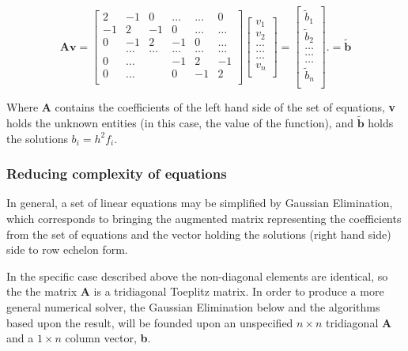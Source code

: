\documentclass[%
oneside,                 %
final,                   %
10pt]{article}
\begin{document}
\[
    \mathbf{A} \mathbf{v}= \begin{bmatrix}
                           2& -1& 0 &\dots   & \dots &0 \\
                           -1 & 2 & -1 &0 &\dots &\dots \\
                           0&-1 &2 & -1 & 0 & \dots \\
                           & \dots   & \dots &\dots   &\dots & \dots \\
                           0&\dots   &  &-1 &2& -1 \\
                           0&\dots    &  & 0  &-1 & 2 \\
              			\end{bmatrix}\begin{bmatrix}
                           v_1\\
                           v_2\\
                           \dots \\
                          \dots  \\
                          \dots \\
                           v_n\\
                      \end{bmatrix}
  =\begin{bmatrix}
                           \tilde{b}_1\\
                           \tilde{b}_2\\
                           \dots \\
                           \dots \\
                          \dots \\
                           \tilde{b}_n\\
                      \end{bmatrix}.=\mathbf{\tilde{b}}
\]

Where \textbf{A} contains the coefficients of the left hand side of the set of equations, \textbf{v} holds the unknown entities (in this case, the value of the  function), and $\mathbf{\tilde{b}}$ holds the solutions $b_i=h^2f_i$. 
\subsubsection{Reducing complexity of equations}
In general, a set of linear equations may be simplified by Gaussian Elimination, which corresponds to bringing the augmented matrix representing the coefficients from the set of equations and the vector holding the solutions (right hand side) side to row echelon form. \par   
In the specific case described above the non-diagonal elements are identical, so the the matrix $\mathbf{A}$ is a tridiagonal Toeplitz matrix. In order to produce a more general numerical solver, the Gaussian Elimination below and the algorithms based upon the result, will be founded upon an unspecified $n \times n$ tridiagonal $\mathbf{A}$ and a $1 \times n$ column vector, \textbf{b}.
\end{document}
